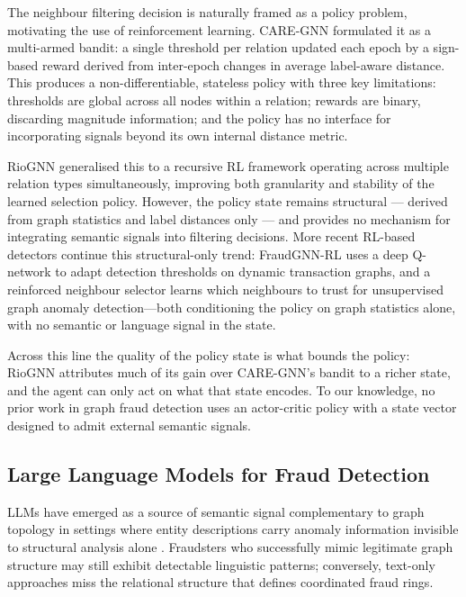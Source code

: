 \documentclass{conf}
\begin{document}
The neighbour filtering decision is naturally framed as a policy
problem, motivating the use of reinforcement learning. CARE-GNN
\cite{dou2020enhancing} formulated it as a multi-armed bandit: a
single threshold per relation updated each epoch by a sign-based
reward derived from inter-epoch changes in average label-aware
distance. This produces a non-differentiable, stateless policy with
three key limitations: thresholds are global across all nodes within
a relation; rewards are binary, discarding magnitude information; and
the policy has no interface for incorporating signals beyond its own
internal distance metric.

RioGNN \cite{peng2022reinforced} generalised this to a recursive RL
framework operating across multiple relation types simultaneously,
improving both granularity and stability of the learned selection
policy. However, the policy state remains structural --- derived from
graph statistics and label distances only --- and provides no
mechanism for integrating semantic signals into filtering decisions.
More recent RL-based detectors continue this structural-only trend:
FraudGNN-RL \cite{cui2025fraudgnnrl} uses a deep Q-network to adapt
detection thresholds on dynamic transaction graphs, and a reinforced
neighbour selector \cite{bei2023rand} learns which neighbours to trust for
unsupervised graph anomaly detection---both conditioning the policy on graph
statistics alone, with no semantic or language signal in the state.

Across this line the quality of the policy state is what bounds the
policy: RioGNN \cite{peng2022reinforced} attributes much of its gain over
CARE-GNN's bandit to a richer state, and the agent can only act on what that
state encodes. To our knowledge, no prior work in graph fraud
detection uses an actor-critic policy with a state vector designed
to admit external semantic signals.

\subsection{Large Language Models for Fraud Detection}

LLMs have emerged as a source of semantic signal complementary to
graph topology in settings where entity descriptions carry anomaly
information invisible to structural analysis alone
\cite{yang2025flag}. Fraudsters who successfully mimic legitimate
graph structure may still exhibit detectable linguistic patterns;
conversely, text-only approaches miss the relational structure that
defines coordinated fraud rings.
\end{document}
